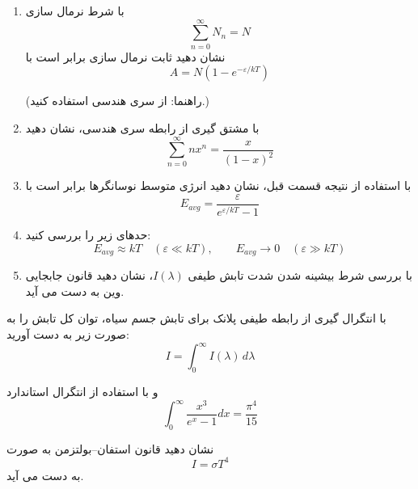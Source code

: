 \documentclass[a4paper,12pt]{article}
\begin{document}
	\begin{enumerate}
		\item[(الف)] با شرط نرمال سازی
		\[
		\sum_{n=0}^{\infty} N_n = N
		\]
		نشان دهید ثابت نرمال سازی برابر است با
		\[
		A = N\left(1 - e^{-\varepsilon/kT}\right)
		\]
		
		(راهنما: از سری هندسی استفاده کنید.)
		
		\item[(ب)] با مشتق گیری از رابطه سری هندسی، نشان دهید
		\[
		\sum_{n=0}^{\infty} n x^n = \frac{x}{(1-x)^2}
		\]
		
		\item[(ج)] با استفاده از نتیجه قسمت قبل، نشان دهید انرژی متوسط نوسانگرها برابر است با
		\[
		E_{avg} = \frac{\varepsilon}{e^{\varepsilon/kT} - 1}
		\]
		
		\item[(د)] حدهای زیر را بررسی کنید:
		\[
		E_{avg} \approx kT \quad (\varepsilon \ll kT), \qquad E_{avg} \to 0 \quad (\varepsilon \gg kT)
		\]
		
		\item[(ه)] با بررسی شرط بیشینه شدن شدت تابش طیفی \(I(\lambda)\)، نشان دهید قانون جابجایی وین به دست می آید.
		
	\end{enumerate}
	
	\vspace{6pt}
	
	با انتگرال گیری از رابطه طیفی پلانک برای تابش جسم سیاه، توان کل تابش را به صورت زیر به دست آورید:
	\[
	I = \int_0^\infty I(\lambda)\, d\lambda
	\]
	
	و با استفاده از انتگرال استاندارد
	\[
	\int_0^\infty \frac{x^3}{e^x - 1} dx = \frac{\pi^4}{15}
	\]
	
	نشان دهید قانون استفان–بولتزمن به صورت
	\[
	I = \sigma T^4
	\]
	به دست می آید.
	
\end{document}
